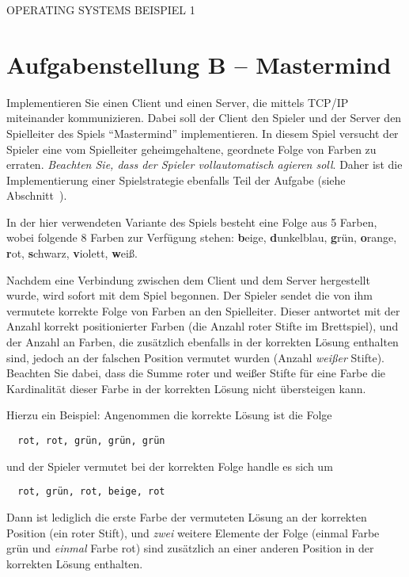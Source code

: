 \documentclass{article}
\begin{document}
\begin{center}
\begin{Large}
OPERATING SYSTEMS BEISPIEL 1
\end{Large}
\end{center}


\section*{Aufgabenstellung B -- Mastermind}\label{sec:aufgabenstellung}
Implementieren Sie einen Client und einen Server, die mittels TCP/IP
miteinander kommunizieren. Dabei soll der Client den Spieler und der Server den
Spielleiter des Spiels ``Mastermind'' implementieren. In diesem Spiel versucht
der Spieler eine vom Spielleiter geheimgehaltene, geordnete Folge von Farben zu
erraten. \emph{Beachten Sie, dass der Spieler vollautomatisch agieren soll}. Daher
ist die Implementierung einer Spielstrategie ebenfalls Teil der Aufgabe
(siehe Abschnitt~).

In der hier verwendeten Variante des Spiels besteht eine Folge aus 5 Farben,
wobei folgende 8 Farben zur Verfügung stehen:
\textbf{b}eige,
\textbf{d}unkelblau,
\textbf{g}r\"un,
\textbf{o}range,
\textbf{r}ot,
\textbf{s}chwarz,
\textbf{v}iolett,
\textbf{w}eiß.

Nachdem eine Verbindung zwischen dem Client und dem Server hergestellt wurde,
wird sofort mit dem Spiel begonnen. Der Spieler sendet die von ihm vermutete
korrekte Folge von Farben an den Spielleiter. Dieser antwortet mit der Anzahl
korrekt positionierter Farben (die Anzahl roter Stifte im Brettspiel), und der
Anzahl an Farben, die zusätzlich ebenfalls in der korrekten Lösung enthalten
sind, jedoch an der falschen Position vermutet wurden (Anzahl \emph{weißer}
Stifte). Beachten Sie dabei, dass die Summe roter und weißer Stifte für eine
Farbe die Kardinalität dieser Farbe in der korrekten Lösung nicht übersteigen
kann.

Hierzu ein Beispiel: Angenommen die korrekte Lösung ist die Folge 
\begin{verbatim}
  rot, rot, grün, grün, grün
\end{verbatim}
und der Spieler vermutet bei der korrekten Folge handle es sich um
\begin{verbatim}
  rot, grün, rot, beige, rot
\end{verbatim}
Dann ist lediglich die erste Farbe der vermuteten Lösung an der korrekten
Position (ein roter Stift), und \emph{zwei} weitere Elemente der Folge (einmal
Farbe grün und \emph{einmal} Farbe rot) sind zusätzlich an einer anderen
Position in der korrekten Lösung enthalten.
\end{document}
